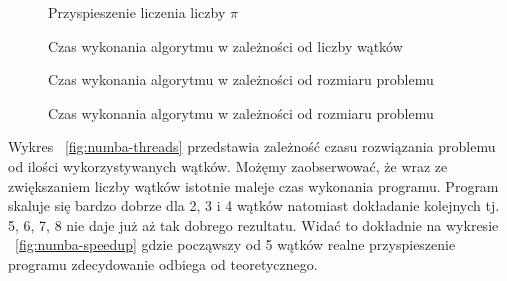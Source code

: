     \begin{figure*}
        \centering
        \begin{minipage}[b]{.45\textwidth}
            \centering
            
            \caption{Przyspieszenie liczenia liczby $\pi$}
            \label{fig:all-speedup}
        \end{minipage}
        \hfill
        \begin{minipage}[b]{.45\textwidth}
            \centering
            
            \caption{Czas wykonania algorytmu w zależności od liczby wątków}
            \label{fig:all-threads}
        \end{minipage}
    \end{figure*}

    \begin{figure*}
        \centering
        
        \caption{Czas wykonania algorytmu w zależności od rozmiaru problemu}
        \label{fig:all-sizes-seq}
    \end{figure*}

    \begin{figure*}
        \centering
        
        \caption{Czas wykonania algorytmu w zależności od rozmiaru problemu}
        \label{fig:all-sizes-parallel}
    \end{figure*}

Wykres ~\ref{fig:numba-threads} przedstawia zależność czasu rozwiązania problemu od ilości wykorzystywanych
wątków. Możęmy zaobserwować, że wraz ze zwiększaniem liczby wątków istotnie maleje czas
wykonania programu. Program skaluje się bardzo dobrze dla 2, 3 i 4 wątków natomiast
dokładanie kolejnych tj. 5, 6, 7, 8 nie daje już aż tak dobrego rezultatu. Widać to dokładnie
na wykresie ~\ref{fig:numba-speedup} gdzie począwszy od 5 wątków realne przyspieszenie
programu zdecydowanie odbiega od teoretycznego.




